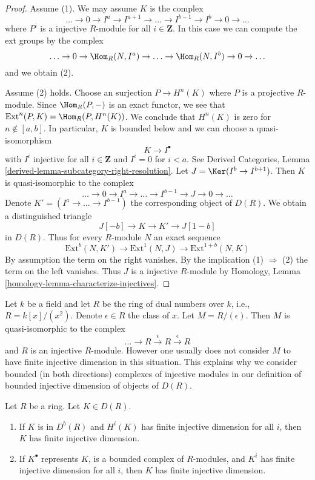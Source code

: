 \begin{proof}
Assume (1). We may assume $K$ is the complex
$$
\ldots \to 0 \to I^a \to I^{a + 1} \to \ldots \to
I^{b - 1} \to I^b \to 0 \to \ldots
$$
where $P^i$ is a injective $R$-module for all $i \in \mathbf{Z}$.
In this case we can compute the ext groups by the complex
$$
\ldots \to 0 \to \Hom_R(N, I^a) \to \ldots \to
\Hom_R(N, I^b) \to 0 \to \ldots
$$
and we obtain (2).

\medskip\noindent
Assume (2) holds. Choose an surjection $P \to H^n(K)$ where $P$
is a projective $R$-module. Since $\Hom_R(P, -)$ is an exact functor,
we see that $\text{Ext}^n(P, K) = \Hom_R(P, H^n(K))$.
We conclude that $H^n(K)$ is zero for $n \not \in [a, b]$.
In particular, $K$ is bounded below and we can choose a quasi-isomorphism
$$
K \to I^\bullet
$$
with $I^i$ injective for all $i \in \mathbf{Z}$ and
$I^i = 0$ for $i < a$. See Derived Categories, Lemma
\ref{derived-lemma-subcategory-right-resolution}.
Let $J = \Ker(I^b \to I^{b + 1})$. Then $K$ is quasi-isomorphic
to the complex
$$
\ldots \to 0 \to I^a \to \ldots \to I^{b - 1} \to J \to 0 \to \ldots
$$
Denote $K' = (I^a \to \ldots \to I^{b - 1})$ the corresponding object of
$D(R)$. We obtain a distinguished triangle
$$
J[-b] \to K \to K' \to J[1 - b]
$$
in $D(R)$. Thus for every $R$-module $N$ an exact sequence
$$
\text{Ext}^b(N, K') \to \text{Ext}^1(N, J) \to \text{Ext}^{1 + b}(N, K)
$$
By assumption the term on the right vanishes. By the implication
(1) $\Rightarrow$ (2) the term on the left vanishes. Thus $J$
is a injective $R$-module by
Homology, Lemma \ref{homology-lemma-characterize-injectives}.
\end{proof}

\begin{example}
\label{example-ext-not-bounded-reversed}
Let $k$ be a field and let $R$ be the ring of dual numbers
over $k$, i.e., $R = k[x]/(x^2)$. Denote $\epsilon \in R$ the
class of $x$. Let $M = R/(\epsilon)$. Then $M$ is quasi-isomorphic
to the complex
$$
\ldots \to R \xrightarrow{\epsilon} R \xrightarrow{\epsilon} R
$$
and $R$ is an injective $R$-module. However one usually does not
consider $M$ to have finite injective dimension in this situation.
This explains why we consider bounded (in both directions) complexes
of injective modules in our definition of bounded injective dimension
of objects of $D(R)$.
\end{example}

\begin{lemma}
\label{lemma-finite-injective-dimension}
Let $R$ be a ring. Let $K \in D(R)$.
\begin{enumerate}
\item If $K$ is in $D^b(R)$ and $H^i(K)$ has finite injective dimension
for all $i$, then $K$ has finite injective dimension.
\item If $K^\bullet$ represents $K$, is a bounded complex of $R$-modules,
and $K^i$ has finite injective dimension for all $i$, then $K$ has finite
injective dimension.
\end{enumerate}
\end{lemma}

